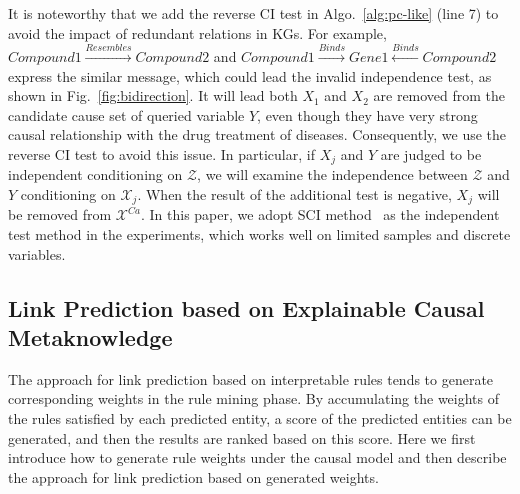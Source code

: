 It is noteworthy that we add the reverse CI test in Algo.~\ref{alg:pc-like} (line 7) to avoid the impact of redundant relations in KGs.
For example, $Compound1 \stackrel{Resembles}{\longrightarrow}Compound2$ and $Compound1 \stackrel{Binds}{\longrightarrow}Gene1\stackrel{Binds}{\longleftarrow}Compound2$ express the similar message, which could lead the invalid independence test, as shown in Fig.~\ref{fig:bidirection}.
It will lead both $X_1$ and $X_2$ are removed from the candidate cause set of queried variable $Y$, even though they have very strong causal relationship with the drug treatment of diseases.
Consequently, we use the reverse CI test to avoid this issue.
In particular, if $X_j$ and $Y$ are judged to be independent conditioning on $\mathcal{Z}$, we will examine the independence between $\mathcal{Z}$ and $Y$ conditioning on $\mathcal{X}_j$.
When the result of the additional test is negative, $X_j$ will be removed from $\mathcal{X}^{Ca}$.
In this paper, we adopt SCI method~\cite{marx2019testing} as the independent test method in the experiments, which works well on limited samples and discrete variables.

\subsection{Link Prediction based on Explainable Causal Metaknowledge}
\label{sec:link_pred}

The approach for link prediction based on interpretable rules tends to generate corresponding weights in the rule mining phase. By accumulating the weights of the rules satisfied by each predicted entity, a score of the predicted entities can be generated, and then the results are ranked based on this score.
Here we first introduce how to generate rule weights under the causal model and then describe the approach for link prediction based on generated weights.

